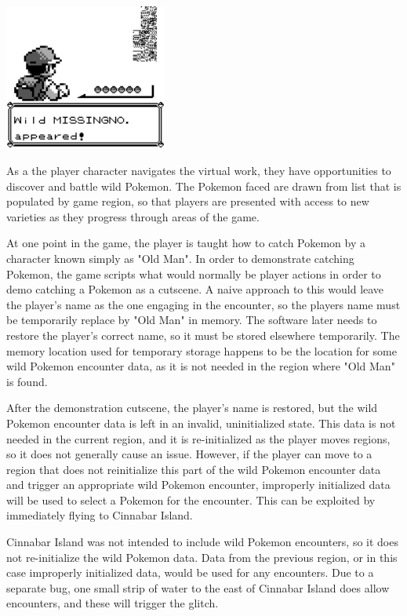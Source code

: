 \documentclass[letterpaper]{article}
\begin{document}
\noindent %
\begin{minipage}{\textwidth}
    \centering
    \includegraphics[width=0.4\textwidth]{missingno.png}
    \label{fig:missingno}
\end{minipage}

As a the player character navigates the virtual work, they have opportunities to discover and battle wild Pokemon. The Pokemon faced are drawn from list that is populated by game region, so that players are presented with access to new varieties as they progress through areas of the game.

At one point in the game, the player is taught how to catch Pokemon by a character known simply as "Old Man". In order to demonstrate catching Pokemon, the game scripts what would normally be player actions in order to demo catching a Pokemon as a cutscene. A naive approach to this would leave the player's name as the one engaging in the encounter, so the players name must be temporarily replace by "Old Man" in memory. The software later needs to restore the player's correct name, so it must be stored elsewhere temporarily. The memory location used for temporary storage happens to be the location for some wild Pokemon encounter data, as it is not needed in the region where "Old Man" is found.

After the demonstration cutscene, the player's name is restored, but the wild Pokemon encounter data is left in an invalid, uninitialized state. This data is not needed in the current region, and it is re-initialized as the player moves regions, so it does not generally cause an issue. However, if the player can move to a region that does not reinitialize this part of the wild Pokemon encounter data and trigger an appropriate wild Pokemon encounter, improperly initialized data will be used to select a Pokemon for the encounter. This can be exploited by immediately flying to Cinnabar Island.

Cinnabar Island was not intended to include wild Pokemon encounters, so it does not re-initialize the wild Pokemon data. Data from the previous region, or in this case improperly initialized data, would be used for any encounters. Due to a separate bug, one small strip of water to the east of Cinnabar Island does allow encounters, and these will trigger the glitch.
\end{document}
